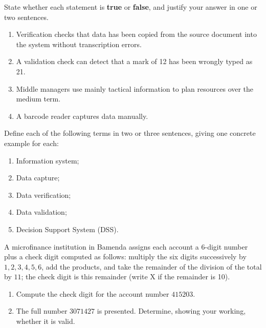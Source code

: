 \documentclass[11pt]{article}
\newcounter{popsec}
\newcounter{popsub}
\newcommand{\courssub}[1]{%
  \stepcounter{popsub}%
  \par\vspace{9pt}\noindent{\popxbold\fontsize{11.5}{13}\selectfont\color{popink}{\color{poporange}\thepopsec.\thepopsub}\hspace{6pt}#1}\par\nopagebreak\vspace{4pt}
}
\begin{document}
\begin{exercice}
State whether each statement is \textbf{true} or \textbf{false}, and justify your answer in one or two sentences.
\begin{enumerate}
\item Verification checks that data has been copied from the source document into the system without transcription errors.
\item A validation check can detect that a mark of 12 has been wrongly typed as 21.
\item Middle managers use mainly tactical information to plan resources over the medium term.
\item A barcode reader captures data manually.
\end{enumerate}
\end{exercice}

\begin{exercice}
Define each of the following terms in two or three sentences, giving one concrete example for each:
\begin{enumerate}
\item Information system;
\item Data capture;
\item Data verification;
\item Data validation;
\item Decision Support System (DSS).
\end{enumerate}
\end{exercice}

\begin{exercice}
A microfinance institution in Bamenda assigns each account a 6-digit number plus a check digit computed as follows: multiply the six digits successively by $1, 2, 3, 4, 5, 6$, add the products, and take the remainder of the division of the total by $11$; the check digit is this remainder (write X if the remainder is 10).
\begin{enumerate}
\item Compute the check digit for the account number $415203$.
\item The full number $3071427$ is presented. Determine, showing your working, whether it is valid.
\end{enumerate}
\end{exercice}

\courssub{I practise}
\end{document}
